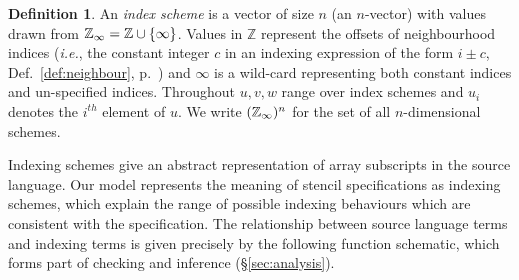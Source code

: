 \documentclass[10pt,preprint]{sigplanconf}
\newcounter{block}
\theoremstyle{definition}
\newtheorem{definition}[block]{Definition}
\newcommand{\ie}{\emph{i.e.}}
\begin{document}
\begin{definition}
  An \emph{index scheme} is a vector of size $n$ (an $n$-vector) with
  values drawn from $\mathbb{Z}_\infty = \mathbb{Z} \cup \{\infty\}$.  Values
  in $\mathbb{Z}$ represent the offsets of neighbourhood indices
  (\ie{}, the constant integer $c$ in an indexing expression of the
  form $i \pm c$, Def.~\ref{def:neighbour},
  p.~\pageref{def:neighbour}) and $\infty$ is a wild-card
  representing both constant indices and un-specified indices. Throughout $u, v, w$ range over
  index schemes and $u_i$ denotes the $i^{th}$ element of $u$. We
  write $(\mathbb{Z}_\infty)^n$ for the set of all $n$-dimensional schemes.
\end{definition}

Indexing schemes give an abstract
representation of array subscripts in the source language.
Our model represents the meaning of stencil specifications
as indexing schemes, which explain the range of possible
indexing behaviours which are consistent with the specification.
The relationship between source language
terms and indexing terms
 is given precisely by the following function \textsf{schematic},
 which forms part of checking and inference (\S\ref{sec:analysis}).
\end{document}
